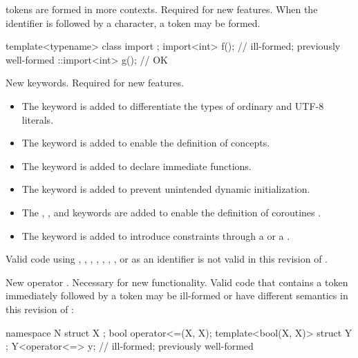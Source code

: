 \change
{} tokens are formed in more contexts.
\rationale
Required for new features.
\effect
When the identifier 
is followed by a \tcode{<} character,
a  token may be formed.
\begin{example}
\begin{codeblock}
template<typename> class import {};
import<int> f();                // ill-formed; previously well-formed
::import<int> g();              // OK
\end{codeblock}
\end{example}

\change
New keywords.
\rationale
Required for new features.
\begin{itemize}
\item
{}%
The  keyword is added to differentiate
the types of ordinary and UTF-8 literals.
\item
The  keyword is
added to enable the definition of concepts.
\item
The  keyword is added to
declare immediate functions.
\item
The  keyword is added to
prevent unintended dynamic initialization.
\item
The , , and  keywords are added
to enable the definition of coroutines .
\item
The  keyword is added
to introduce constraints through a 
or a .
\end{itemize}
\effectafteritemize
Valid \CppXVII{} code using
,
,
,
,
, , ,
or 
as an identifier is not valid in this revision of \Cpp{}.

\change
New operator \tcode{<=>}.
\rationale
Necessary for new functionality.
\effect
Valid \CppXVII{} code that contains a \tcode{<=} token
immediately followed by a \tcode{>} token
may be ill-formed or have different semantics in this revision of \Cpp{}:
\begin{codeblock}
namespace N {
  struct X {};
  bool operator<=(X, X);
  template<bool(X, X)> struct Y {};
  Y<operator<=> y;              // ill-formed; previously well-formed
}
\end{codeblock}

